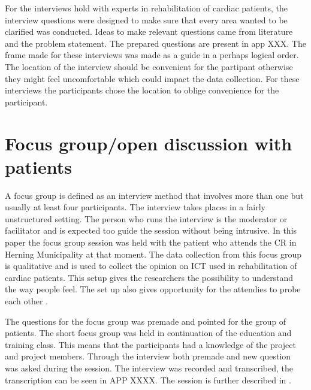 For the interviews hold with experts in rehabilitation of cardiac patients, the interview questions were designed to make sure that every area wanted to be clarified was conducted. Ideas to make relevant questions came from literature and the problem statement. The prepared questions are present in app XXX. The frame made for these interviews was made as a guide in a perhaps logical order. The location of the interview should be convenient for the partipant otherwise they might feel uncomfortable which could impact the data collection. For these interviews the participants chose the location to oblige convenience for the participant. 

\section {Focus group/open discussion with patients} \label{focusgroup}

A focus group is defined as an interview method that involves more than one but usually at least four participants. The interview takes places in a fairly unstructured setting. The person who runs the interview is the moderator or facilitator and is expected too guide the session without being intrusive. In this paper the focus group session was held with the patient who attends the CR in Herning Municipality at that moment. The data collection from this focus group is qualitative and is used to collect the opinion on ICT used in rehabilitation of cardiac patients. This setup gives the researchers the possibility to understand the way people feel. The set up also gives opportunity for the attendies to probe each other \cite{brymanbell}. 

The questions for the focus group was premade and pointed for the group of patients. The short focus group was held in continuation of the education and training class. This means that the participants had a knowledge of the project and project members.
Through the interview both premade and new question was asked during the session. The interview was recorded and transcribed, the transcription can be seen in APP XXXX. The session is further described in . 


